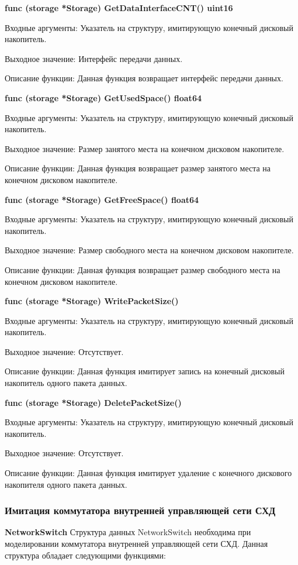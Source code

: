 \textbf{func (storage *Storage) GetDataInterfaceCNT() uint16}

Входные аргументы: Указатель на структуру, имитирующую конечный дисковый накопитель.

Выходное значение: Интерфейс передачи данных. 

Описание функции: Данная функция возвращает интерфейс передачи данных.

\textbf{func (storage *Storage) GetUsedSpace() float64 }

Входные аргументы: Указатель на структуру, имитирующую конечный дисковый накопитель.

Выходное значение:  Размер занятого места на конечном дисковом накопителе.

Описание функции: Данная функция возвращает размер занятого места на конечном дисковом накопителе.

\textbf{func (storage *Storage) GetFreeSpace() float64}

Входные аргументы: Указатель на структуру, имитирующую конечный дисковый накопитель.

Выходное значение: Размер свободного места на конечном дисковом накопителе.

Описание функции: Данная функция возвращает размер свободного места на конечном дисковом накопителе.

\textbf{func (storage *Storage) WritePacketSize() }

Входные аргументы: Указатель на структуру, имитирующую конечный дисковый накопитель.

Выходное значение: Отсутствует.

Описание функции: Данная функция имитирует запись на конечный дисковый накопитель одного пакета данных.

\textbf{func (storage *Storage) DeletePacketSize()}

Входные аргументы: Указатель на структуру, имитирующую конечный дисковый накопитель.

Выходное значение: Отсутствует.

Описание функции: Данная функция имитирует удаление с конечного дискового накопителя одного пакета данных.

\subsubsection{Имитация коммутатора внутренней управляющей сети СХД}
\textbf{NetworkSwitch}
Структура данных NetworkSwitch необходима при моделировании коммутатора внутренней управляющей сети СХД. Данная структура обладает следующими функциями:

